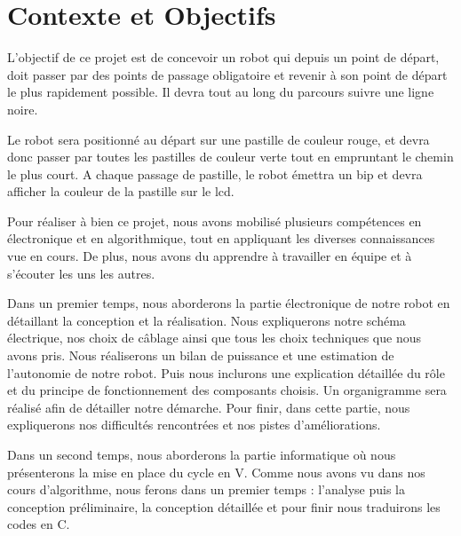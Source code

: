 \section{Contexte et Objectifs}

L'objectif de ce projet est de concevoir un robot qui depuis un point de départ, doit passer par des points de passage obligatoire et revenir à son point de départ le plus rapidement possible. Il devra tout au long du parcours suivre une ligne noire.

Le robot sera positionné au départ sur une pastille de couleur rouge, et devra donc passer par toutes les pastilles de couleur verte tout en empruntant le chemin le plus court. A chaque passage de pastille, le robot émettra un bip et devra afficher la couleur de la pastille sur le lcd. 

Pour réaliser à bien ce projet, nous avons mobilisé plusieurs compétences en électronique et en algorithmique, tout en appliquant les diverses connaissances vue en cours. De plus, nous avons du apprendre à travailler en équipe et à s'écouter les uns les autres.

Dans un premier temps, nous aborderons la partie électronique de notre robot en détaillant la conception et la réalisation. Nous expliquerons notre schéma électrique, nos choix de câblage ainsi que tous les choix techniques que nous avons pris. Nous réaliserons un bilan de puissance et une estimation de l'autonomie de notre robot. Puis nous inclurons une explication détaillée du rôle et du principe de fonctionnement des composants choisis. Un organigramme sera réalisé afin de détailler notre démarche. Pour finir, dans cette partie, nous expliquerons nos difficultés rencontrées et nos pistes d'améliorations.

Dans un second temps, nous aborderons la partie informatique où nous présenterons la mise en place du cycle en V. Comme nous avons vu dans nos cours d'algorithme, nous ferons dans un premier temps : l'analyse puis la conception préliminaire, la conception détaillée et pour finir nous traduirons les codes en C.
